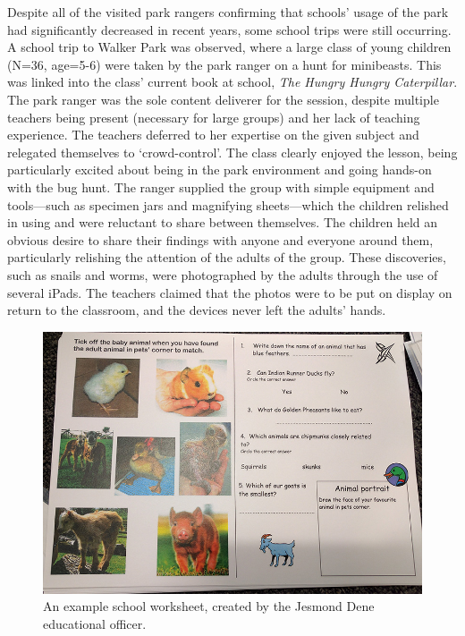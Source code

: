 Despite all of the visited park rangers confirming that schools’ usage of the park had significantly decreased in recent years, some school trips were still occurring. A school trip to Walker Park was observed, where a large class of young children (N=36, age=5-6) were taken by the park ranger on a hunt for minibeasts. This was linked into the class' current book at school, \textit{The Hungry Hungry Caterpillar}. The park ranger was the sole content deliverer for the session, despite multiple teachers being present (necessary for large groups) and her lack of teaching experience. The teachers deferred to her expertise on the given subject and relegated themselves to `crowd-control'. The class clearly enjoyed the lesson, being particularly excited about being in the park environment and going hands-on with the bug hunt. The ranger supplied the group with simple equipment and tools---such as specimen jars and magnifying sheets---which the children relished in using and were reluctant to share between themselves. The children held an obvious desire to share their findings with anyone and everyone around them, particularly relishing the attention of the adults of the group. These discoveries, such as snails and worms, were photographed by the adults through the use of several iPads. The teachers claimed that the photos were to be put on display on return to the classroom, and the devices never left the adults' hands.

\begin{figure}
  \centering
  \includegraphics[width=0.8\columnwidth]{images/chapter04/worksheet.jpg}
  \caption[An existing park worksheet]{An example school worksheet, created by the Jesmond Dene educational officer.}
  \label{fig:worksheet}
\end{figure}

